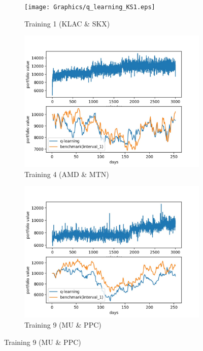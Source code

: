 \begin{figure}[H]
\begin{subfigure}{.5\textwidth}%
\centering
\texttt{[image: Graphics/q\_learning\_KS1.eps]} \caption{Training 1 (KLAC \& SKX)} 
\end{subfigure}%
\begin{subfigure}{.5\textwidth}%
\centering
\includegraphics[clip, width=1.1\textwidth]{Graphics/q_learning_AM4.jpg} \caption{Training 4 (AMD \& MTN)}
\end{subfigure}%
\vspace{0.1cm}
\begin{subfigure}{.5\textwidth}%
\centering
\includegraphics[clip, width=1.1\textwidth]{Graphics/q_learning_MP9.jpg} \caption{Training 9 (MU \& PPC)}

\end{subfigure}
\end{figure}
